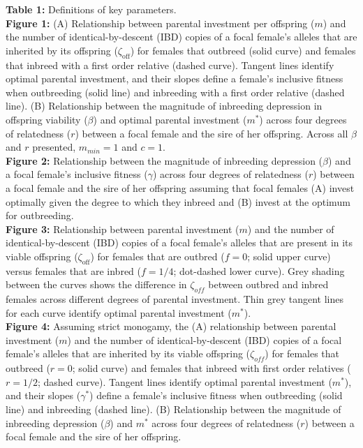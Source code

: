 \documentclass[12pt]{article}
\begin{document}



\clearpage

\noindent \textbf{Table 1:}  Definitions of key parameters. \\

\noindent \textbf{Figure 1:} (A) Relationship between parental investment per offspring ($m$) and the number of identical-by-descent (IBD) copies of a focal female's alleles that are inherited by its offspring ($\zeta_{\textrm{off}}$) for females that outbreed (solid curve) and females that inbreed with a first order relative (dashed curve). Tangent lines identify optimal parental investment, and their slopes define a female's inclusive fitness when outbreeding (solid line) and inbreeding with a first order relative (dashed line). (B) Relationship between the magnitude of inbreeding depression in offspring viability ($\beta$) and optimal parental investment ($m^{*}$) across four degrees of relatedness ($r$) between a focal female and the sire of her offspring. Across all $\beta$ and $r$ presented, $m_{min}=1$ and $c=1$. \\

\noindent \textbf{Figure 2:} Relationship between the magnitude of inbreeding depression ($\beta$) and a focal female's inclusive fitness ($\gamma$) across four degrees of relatedness ($r$) between a focal female and the sire of her offspring assuming that focal females (A) invest optimally given the degree to which they inbreed and (B) invest at the optimum for outbreeding. \\

\noindent \textbf{Figure 3:} Relationship between parental investment ($m$) and the number of identical-by-descent (IBD) copies of a focal female's alleles that are present in its viable offspring ($\zeta_{\textrm{off}}$) for females that are outbred ($f=0$; solid upper curve) versus females that are inbred ($f=1/4$; dot-dashed lower curve). Grey shading between the curves shows the difference in $\zeta_{off}$ between outbred and inbred females across different degrees of parental investment. Thin grey tangent lines for each curve identify optimal parental investment ($m^{*}$). \\

\noindent \textbf{Figure 4:} Assuming strict monogamy, the (A) relationship between parental investment ($m$) and the number of identical-by-descent (IBD) copies of a focal female's alleles that are inherited by its viable offspring ($\zeta_{off}$) for females that outbreed ($r=0$; solid curve) and females that inbreed with first order relatives ($r=1/2$; dashed curve). Tangent lines identify optimal parental investment ($m^{*}$), and their slopes ($\gamma^{*}$) define a female's inclusive fitness when outbreeding (solid line) and inbreeding (dashed line). (B) Relationship between the magnitude of inbreeding depression ($\beta$) and $m^{*}$ across four degrees of relatedness ($r$) between a focal female and the sire of her offspring. \\
\end{document}
